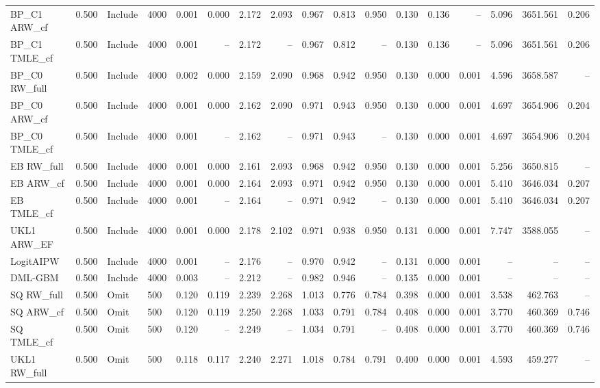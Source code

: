 \begin{tabular}{llllrrrrrrrrrrrrr}
BP\_C1 ARW\_cf & 0.500 & Include & 4000 & 0.001 & 0.000 & 2.172 & 2.093 & 0.967 & 0.813 & 0.950 & 0.130 & 0.136 & -- & 5.096 & 3651.561 & 0.206 \\
BP\_C1 TMLE\_cf & 0.500 & Include & 4000 & 0.001 & -- & 2.172 & -- & 0.967 & 0.812 & -- & 0.130 & 0.136 & -- & 5.096 & 3651.561 & 0.206 \\
BP\_C0 RW\_full & 0.500 & Include & 4000 & 0.002 & 0.000 & 2.159 & 2.090 & 0.968 & 0.942 & 0.950 & 0.130 & 0.000 & 0.001 & 4.596 & 3658.587 & -- \\
BP\_C0 ARW\_cf & 0.500 & Include & 4000 & 0.001 & 0.000 & 2.162 & 2.090 & 0.971 & 0.943 & 0.950 & 0.130 & 0.000 & 0.001 & 4.697 & 3654.906 & 0.204 \\
BP\_C0 TMLE\_cf & 0.500 & Include & 4000 & 0.001 & -- & 2.162 & -- & 0.971 & 0.943 & -- & 0.130 & 0.000 & 0.001 & 4.697 & 3654.906 & 0.204 \\
EB RW\_full & 0.500 & Include & 4000 & 0.001 & 0.000 & 2.161 & 2.093 & 0.968 & 0.942 & 0.950 & 0.130 & 0.000 & 0.001 & 5.256 & 3650.815 & -- \\
EB ARW\_cf & 0.500 & Include & 4000 & 0.001 & 0.000 & 2.164 & 2.093 & 0.971 & 0.942 & 0.950 & 0.130 & 0.000 & 0.001 & 5.410 & 3646.034 & 0.207 \\
EB TMLE\_cf & 0.500 & Include & 4000 & 0.001 & -- & 2.164 & -- & 0.971 & 0.942 & -- & 0.130 & 0.000 & 0.001 & 5.410 & 3646.034 & 0.207 \\
UKL1 ARW\_EF & 0.500 & Include & 4000 & 0.001 & 0.000 & 2.178 & 2.102 & 0.971 & 0.938 & 0.950 & 0.131 & 0.000 & 0.001 & 7.747 & 3588.055 & -- \\
LogitAIPW & 0.500 & Include & 4000 & 0.001 & -- & 2.176 & -- & 0.970 & 0.942 & -- & 0.131 & 0.000 & 0.001 & -- & -- & -- \\
DML-GBM & 0.500 & Include & 4000 & 0.003 & -- & 2.212 & -- & 0.982 & 0.946 & -- & 0.135 & 0.000 & 0.001 & -- & -- & -- \\
SQ RW\_full & 0.500 & Omit & 500 & 0.120 & 0.119 & 2.239 & 2.268 & 1.013 & 0.776 & 0.784 & 0.398 & 0.000 & 0.001 & 3.538 & 462.763 & -- \\
SQ ARW\_cf & 0.500 & Omit & 500 & 0.120 & 0.119 & 2.250 & 2.268 & 1.033 & 0.791 & 0.784 & 0.408 & 0.000 & 0.001 & 3.770 & 460.369 & 0.746 \\
SQ TMLE\_cf & 0.500 & Omit & 500 & 0.120 & -- & 2.249 & -- & 1.034 & 0.791 & -- & 0.408 & 0.000 & 0.001 & 3.770 & 460.369 & 0.746 \\
UKL1 RW\_full & 0.500 & Omit & 500 & 0.118 & 0.117 & 2.240 & 2.271 & 1.018 & 0.784 & 0.791 & 0.400 & 0.000 & 0.001 & 4.593 & 459.277 & -- \\

\end{tabular}
